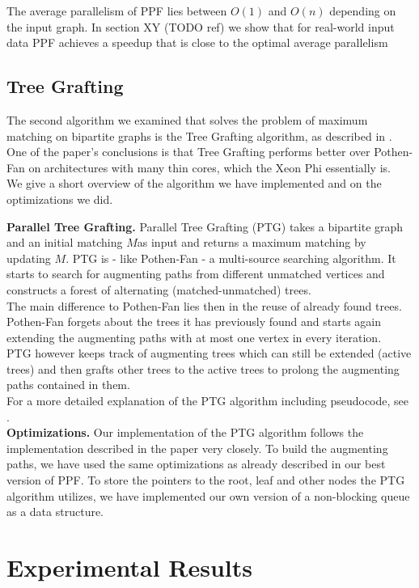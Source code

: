 \documentclass[letterpaper]{article}
\newcommand{\mypar}[1]{{\bf #1.}}
\begin{document}
The average parallelism of PPF lies between $O(1)$ and $O(n)$ depending on the input graph. 
In section XY (TODO ref) we show that for real-world input data PPF achieves a speedup that is close to the optimal average parallelism

\subsection{Tree Grafting}\label{sec:tg}

The second algorithm we examined that solves the problem of maximum matching on bipartite graphs is the Tree Grafting algorithm, as described in \cite{Azad:2015}. One of the paper's conclusions is that Tree Grafting performs better over Pothen-Fan on architectures with many thin cores, which the Xeon Phi essentially is. \\
We give a short overview of the algorithm we have implemented and on the optimizations we did.

\mypar{Parallel Tree Grafting} 
Parallel Tree Grafting (PTG) takes a bipartite graph and an initial matching $M $as input and returns a maximum matching by updating $M$.
PTG is - like Pothen-Fan - a multi-source searching algorithm. It starts to search for augmenting paths from different unmatched vertices and constructs a forest of alternating (matched-unmatched) trees.\\
The main difference to Pothen-Fan lies then in the reuse of already found trees. Pothen-Fan forgets about the trees it has previously found and starts again extending the augmenting paths with at most one vertex in every iteration. \\
PTG however keeps track of augmenting trees which can still be extended (active trees) and then grafts other trees to the active trees to prolong the augmenting paths contained in them.\\
For a more detailed explanation of the PTG algorithm including pseudocode, see \cite{Azad:2015}.\\
\mypar{Optimizations}
Our implementation of the PTG algorithm follows the implementation described in the paper very closely. To build the augmenting paths, we have used the same optimizations as already described in our best version of  PPF. To store the pointers to the root, leaf and other nodes the PTG algorithm utilizes, we have implemented our own version of a non-blocking queue as a data structure. 

\section{Experimental Results}\label{sec:exp}
\end{document}
